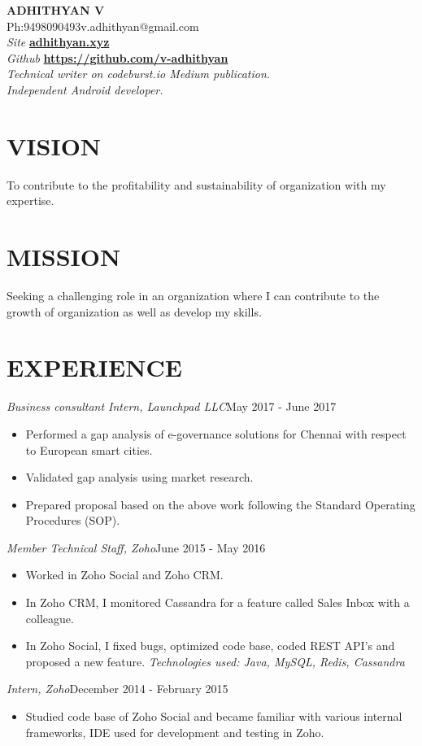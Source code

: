 \documentclass[11pt,a4paper]{article}
\begin{document}
\begin{center}
{\LARGE{\textbf{ADHITHYAN V}}}\\
{Ph:9498090493\hfill}{\hfill v.adhithyan@gmail.com} \\
\emph{Site} \textbf{\href{adhithyan.xyz}{adhithyan.xyz}} \\
\emph{Github} \textbf{\href{https://github.com/v-adhithyan}{https://github.com/v-adhithyan}}\\
\emph{Technical writer on codeburst.io Medium publication.}\\
\emph{Independent Android developer.}\\
\noindent\makebox[\linewidth]{\rule{\paperwidth}{0.4pt}}
\end{center}
\begin{multicols}{2}
\section*{VISION}
\par To contribute to the profitability and sustainability of organization with my expertise.
\section*{MISSION}
\par Seeking a challenging role in an organization where I can contribute to the growth of organization as well as develop my skills.
\end{multicols}
\section*{EXPERIENCE}
\emph{Business consultant Intern, Launchpad LLC}{\hfill May 2017 -  June 2017}
\begin{itemize}[noitemsep]
\item Performed a gap analysis of e-governance solutions for Chennai with respect to European smart cities.
\item Validated gap analysis using market research.
\item Prepared proposal based on the above work following the Standard Operating Procedures (SOP).
\end{itemize}
\emph{Member Technical Staff, Zoho}{\hfill June 2015 - May 2016}
\begin{itemize}[noitemsep]
\item Worked in Zoho Social and Zoho CRM.
\item In Zoho CRM, I monitored Cassandra for a feature called Sales Inbox with a colleague.
\item In Zoho Social, I fixed bugs, optimized code base, coded REST API's and proposed a new feature. \emph {Technologies used: Java, MySQL, Redis, Cassandra}
\end{itemize}
\emph{Intern, Zoho}{\hfill December 2014 - February 2015}
\begin{itemize}[noitemsep]
\item Studied code base of Zoho Social and became familiar with various internal frameworks, IDE used for development and testing in Zoho.
\end{itemize}
\end{document}
